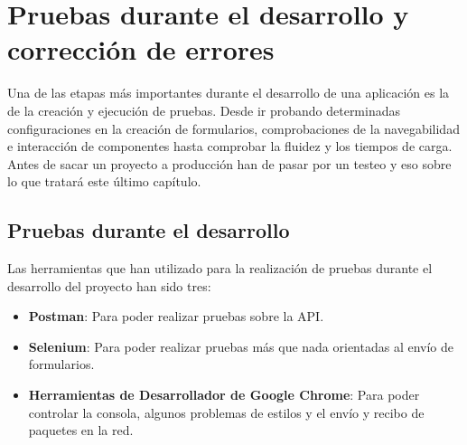 \chapter{Pruebas durante el desarrollo y corrección de errores}
Una de las etapas más importantes durante el desarrollo de una aplicación es la de la creación y ejecución de pruebas. Desde ir probando determinadas configuraciones en la creación de formularios, comprobaciones de la navegabilidad e interacción de componentes hasta comprobar la fluidez y los tiempos de carga.
\\Antes de sacar un proyecto a producción han de pasar por un testeo y eso sobre lo que tratará este último capítulo.

\section{Pruebas durante el desarrollo}
Las herramientas que han utilizado para la realización de pruebas durante el desarrollo del proyecto han sido tres:
\begin{itemize}
    \item \textbf{Postman}: Para poder realizar pruebas sobre la API.
    \item \textbf{Selenium}: Para poder realizar pruebas más que nada orientadas al envío de formularios.
    \item \textbf{Herramientas de Desarrollador de Google Chrome}: Para poder controlar la consola, algunos problemas de estilos y el envío y recibo de paquetes en la red.
\end{itemize}

